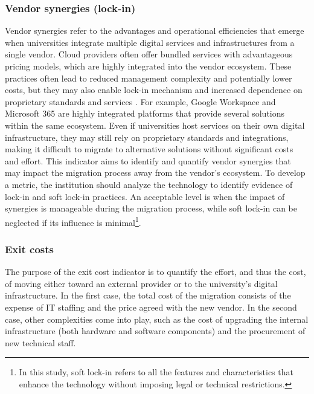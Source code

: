 \subsubsection{Vendor synergies (lock-in)}
Vendor synergies refer to the advantages and operational efficiencies that emerge when universities integrate multiple digital services and infrastructures from a single vendor. Cloud providers often offer bundled services with advantageous pricing models, which are highly integrated into the vendor ecosystem. These practices often lead to reduced management complexity and potentially lower costs, but they may also enable lock-in mechanism and increased dependence on proprietary standards and services \cite{komljenovic_rise_2021}\cite{fiebig_heads_2023}. For example, Google Workspace and Microsoft 365 are highly integrated platforms that provide several solutions within the same ecosystem. Even if universities host services on their own digital infrastructure, they may still rely on proprietary standards and integrations, making it difficult to migrate to alternative solutions without significant costs and effort.
This indicator aims to identify and quantify vendor synergies that may impact the migration process away from the vendor’s ecosystem. To develop a metric, the institution should analyze the technology to identify evidence of lock-in and soft lock-in practices. An acceptable level is when the impact of synergies is manageable during the migration process, while soft lock-in can be neglected if its influence is minimal\footnote{In this study, soft lock-in refers to all the features and characteristics that enhance the technology without imposing legal or technical restrictions.}.

\subsubsection{Exit costs}
The purpose of the exit cost indicator is to quantify the effort, and thus the cost, of moving either toward an external provider or to the university's digital infrastructure. In the first case, the total cost of the migration consists of the expense of IT staffing and the price agreed with the new vendor. In the second case, other complexities come into play, such as the cost of upgrading the internal infrastructure (both hardware and software components) and the procurement of new technical staff.       

\bigskip

